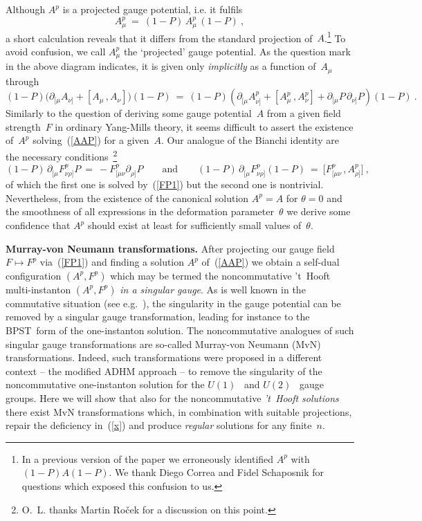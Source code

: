 \documentclass[a4paper,11pt]{article}
\numberwithin{equation}{section}
\def\th{\theta}
\def\pa{\mbox{$\partial$}}
\begin{document}
{Although $A^p$ is a projected gauge potential, i.e. it fulfils
\begin{equation}
A^p_\mu\ =\ (1{-}P)\,A^p_\mu\,(1{-}P) \ ,
\end{equation}
a short calculation reveals that it differs from 
the standard projection of~$A$.\footnote{
In a previous version of the paper we erroneously identified $A^p$ with
$(1{-}P)A(1{-}P)$. We thank Diego Correa and Fidel Schaposnik for questions
which exposed this confusion to us.} 
To avoid confusion, we call $A^p_\mu$ the `projected' gauge potential.
As the question mark in the above diagram indicates,
it is given only {\it implicitly\/} as a function of~$A_\mu$ through
\begin{equation}\label{AAP}
(1{-}P) \bigl( \pa_{[\mu} A_{\nu]} + [A_\mu\,,A_\nu] \bigr) (1{-}P)\ =\
(1{-}P) (\pa^{\phantom{p}}_{[\mu} A^p_{\nu]} + [A^p_\mu\,,A^p_\nu]+ 
\pa_{[\mu}P\,\pa_{\nu]}P)(1{-}P) \ .
\end{equation}
Similarly to the question of deriving some gauge potential~$A$ from a given
field strength~$F$ in ordinary Yang-Mills theory, it seems difficult to assert 
the existence of~$A^p$ solving~(\ref{AAP}) for a given~$A$. 
Our analogue of the Bianchi identity are the necessary conditions~\footnote{
O.~L. thanks Martin Ro\v cek for a discussion on this point.}
\begin{equation}
(1{-}P)\,\pa^{\phantom{p}}_{[\mu}F^p_{\nu\rho]} P\ =\ 
-F^p_{[\mu\nu} \pa^{\phantom{p}}_{\rho]} P
\qquad\textrm{and}\qquad
(1{-}P)\,\pa^{\phantom{p}}_{[\mu}F^p_{\nu\rho]} (1{-}P)\ =\
\bigl[ F^p_{[\mu\nu}\,,A^p_{\rho]} \bigr] \ ,
\end{equation}
of which the first one is solved by~(\ref{FP1}) 
but the second one is nontrivial.
Nevertheless, from the existence of the canonical solution $A^p{=}A$
for $\th{=}0$ and the smoothness of all expressions in the deformation
parameter~$\th$ we derive some confidence that $A^p$ should exist at least
for sufficiently small values of~$\th$.

\noindent
{\bf Murray-von Neumann transformations.}
After projecting our gauge field $F\mapsto F^p$ via~(\ref{FP1})
and finding a solution $A^p$ of~(\ref{AAP}) we obtain a self-dual
configuration $(A^p,F^p)$ which may be termed the noncommutative 
't~Hooft multi-instanton $(A^p,F^p)$ {\it in a singular gauge\/}.
As is well known in the commutative situation 
(see e.g.~\cite{Rajaraman:1982is}), the singularity in the gauge potential 
can be removed by a singular gauge transformation, 
leading for instance to the BPST~form of the one-instanton solution.
The noncommutative analogues of such singular gauge transformations
are so-called Murray-von Neumann (MvN) transformations.
Indeed, such transformations were proposed in a different context 
-- the modified ADHM approach --
to remove the singularity of the noncommutative one-instanton solution for 
the $U(1)$~\cite{Ho:2000ea} and $U(2)$~\cite{Furuuchi:2001vx} gauge groups.
Here we will show that also for the noncommutative {\it 't~Hooft solutions\/} 
there exist MvN transformations which, in combination with suitable 
projections, repair the deficiency in~(\ref{x}) 
and produce {\it regular\/} solutions for any finite~$n$. 

}
\end{document}
